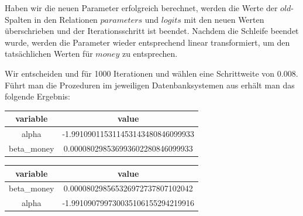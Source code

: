 Haben wir die neuen Parameter erfolgreich berechnet, werden die Werte der $old$-Spalten in den Relationen $parameters$ und $logits$ mit den neuen Werten überschrieben und der Iterationsschritt ist beendet. Nachdem die Schleife beendet wurde, werden die Parameter wieder entsprechend linear transformiert, um den tatsächlichen Werten für $money$ zu entsprechen.

Wir entscheiden und für 1000 Iterationen und wählen eine Schrittweite von $0.008$. Führt man die Prozeduren im jeweiligen Datenbanksystemen aus erhält man das folgende Ergebnis:

\begin{center}
  \begin{tabular}{|c|c|}\hline
    \textbf{variable} & \textbf{value} \\ \hline
    alpha & -1.991090115311453143480846099933 \\ \hline
    beta\_money & 0.000080298536993602280846099933 \\ \hline
  \end{tabular}

  \begin{tabular}{|c|c|}\hline
    \textbf{variable} & \textbf{value} \\ \hline
    beta\_money & 0.000080298565326972737807102042 \\ \hline
    alpha & -1.991090799730035106155294219916 \\ \hline
  \end{tabular}
\end{center}
